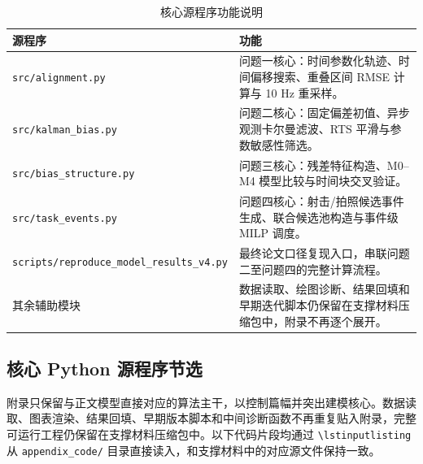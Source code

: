 \documentclass{cumcmthesis}
\begin{document}
\begin{table}[H]
  \centering
  \caption{核心源程序功能说明}
  \label{tab:source_programs}
  \footnotesize
  \begin{tabular}{p{}p{}}
    \toprule
    源程序 & 功能\\
    \midrule
    \texttt{src/alignment.py} & 问题一核心：时间参数化轨迹、时间偏移搜索、重叠区间 RMSE 计算与 10 Hz 重采样。\\
    \texttt{src/kalman\_bias.py} & 问题二核心：固定偏差初值、异步观测卡尔曼滤波、RTS 平滑与参数敏感性筛选。\\
    \texttt{src/bias\_structure.py} & 问题三核心：残差特征构造、M0--M4 模型比较与时间块交叉验证。\\
    \texttt{src/task\_events.py} & 问题四核心：射击/拍照候选事件生成、联合候选池构造与事件级 MILP 调度。\\
    \texttt{scripts/reproduce\_model\_results\_v4.py} & 最终论文口径复现入口，串联问题二至问题四的完整计算流程。\\
    其余辅助模块 & 数据读取、绘图诊断、结果回填和早期迭代脚本仍保留在支撑材料压缩包中，附录不再逐个展开。\\
    \bottomrule
  \end{tabular}
\end{table}

\subsection{核心 Python 源程序节选}
附录只保留与正文模型直接对应的算法主干，以控制篇幅并突出建模核心。数据读取、图表渲染、结果回填、早期版本脚本和中间诊断函数不再重复贴入附录，完整可运行工程仍保留在支撑材料压缩包中。以下代码片段均通过 \texttt{\textbackslash lstinputlisting} 从 \texttt{appendix\_code/} 目录直接读入，和支撑材料中的对应源文件保持一致。









\end{document}
